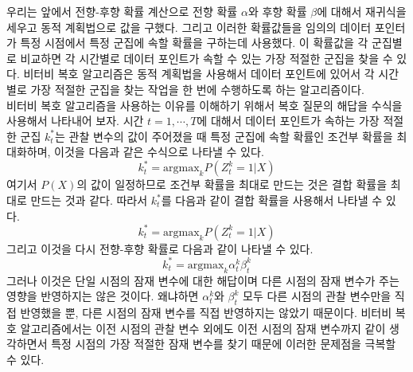 \documentclass[a4paper]{oblivoir}
\begin{document}
우리는 앞에서 전향-후향 확률 계산으로 전향 확률 $\alpha$와 후향 확률 $\beta$에 대해서 재귀식을 세우고 동적 계획법으로 값을 구했다. 그리고 이러한 확률값들을 임의의 데이터 포인터가 특정 시점에서 특정 군집에 속할 확률을 구하는데 사용했다. 이 확률값을 각 군집별로 비교하면 각 시간별로 데이터 포인트가 속할 수 있는 가장 적절한 군집을 찾을 수 있다. 비터비 복호 알고리즘은 동적 계획법을 사용해서 데이터 포인트에 있어서 각 시간별로 가장 적절한 군집을 찾는 작업을 한 번에 수행하도록 하는 알고리즘이다. \\

비터비 복호 알고리즘을 사용하는 이유를 이해하기 위해서 복호 질문의 해답을 수식을 사용해서 나타내어 보자. 시간 $t=1,\cdots,T$에 대해서 데이터 포인트가 속하는 가장 적절한 군집 $k_{t}^{*}$는 관찰 변수의 값이 주어졌을 때 특정 군집에 속할 확률인 조건부 확률을 최대화하며, 이것을 다음과 같은 수식으로 나타낼 수 있다. 
\begin{equation}
k_{t}^{*} = \textrm{argmax}_{k} P(Z_{t}^{k} = 1 | X)
\label{eq:9-22}
\end{equation}
여기서 $P(X)$의 값이 일정하므로 조건부 확률을 최대로 만드는 것은 결합 확률을 최대로 만드는 것과 같다. 따라서 $k_{t}^{*}$를 다음과 같이 결합 확률을 사용해서 나타낼 수 있다. 
\begin{equation}
k_{t}^{*} = \textrm{argmax}_{k} P(Z_{t}^{k} = 1 | X)
\label{eq:9-23}
\end{equation}
그리고 이것을 다시 전향-후향 확률로 다음과 같이 나타낼 수 있다. 
\begin{equation}
k_{t}^{*} = \textrm{argmax}_{k} \alpha_{t}^{k} \beta_{t}^{k}
\label{eq:9-24}
\end{equation}
그러나 이것은 단일 시점의 잠재 변수에 대한 해답이며 다른 시점의 잠재 변수가 주는 영향을 반영하지는 않은 것이다. 왜냐하면 $\alpha_{t}^{k}$와 $\beta_{t}^{k}$ 모두 다른 시점의 관찰 변수만을 직접 반영했을 뿐, 다른 시점의 잠재 변수를 직접 반영하지는 않았기 때문이다. 비터비 복호 알고리즘에서는 이전 시점의 관찰 변수 외에도 이전 시점의 잠재 변수까지 같이 생각하면서 특정 시점의 가장 적절한 잠재 변수를 찾기 때문에 이러한 문제점을 극복할 수 있다. \\
\end{document}
